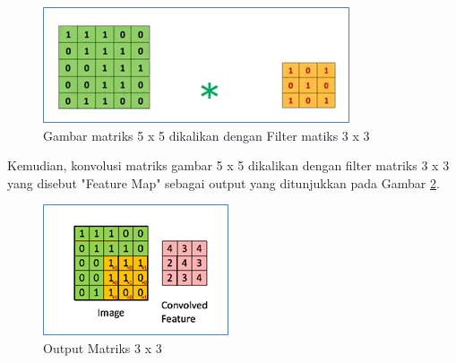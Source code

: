 \begin{enumerate}
	\begin{figure}[H]
		\vspace{-0.1cm}
		\begin{center}
			\includegraphics[width=0.7\columnwidth]{bab2/Gambar/Picture19.png}
		\end{center}
		\vspace{-0.2cm}
		\captionsetup{justification=centering}
		\caption{Gambar matriks 5 x 5 dikalikan dengan Filter matiks 3 x 3}\label{img:Matriks5x5}
	\end{figure}
	
	Kemudian, konvolusi matriks gambar 5 x 5 dikalikan dengan filter matriks 3 x 3 yang disebut "Feature Map" sebagai output yang ditunjukkan pada Gambar \ref{img:Output-Matriks-3-3}.
	
	\begin{figure}[H]
		\vspace{-0.1cm}
		\begin{center}
			\includegraphics[width=0.7\columnwidth]{bab2/Gambar/Picture20.png}
		\end{center}
		\vspace{-0.2cm}
		\captionsetup{justification=centering}
		\caption{Output Matriks 3 x 3}\label{img:Output-Matriks-3-3}
	\end{figure}
	

\end{enumerate}
